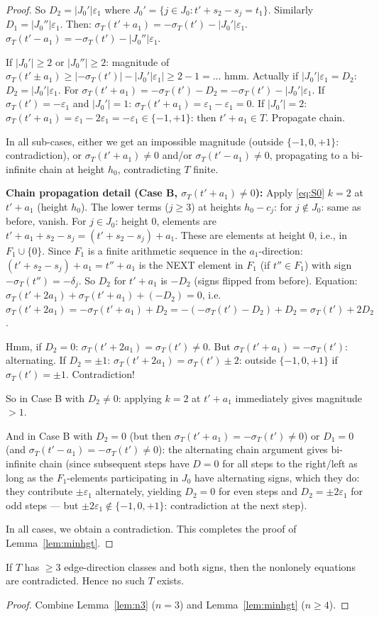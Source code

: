 \begin{proof}
So $D_2 = |J_0'| \varepsilon_1$ where $J_0' = \{j \in J_0 : t'+s_2-s_j = t_1\}$.
Similarly $D_1 = |J_0''| \varepsilon_1$.  Then:
$\sigma_T(t'+a_1) = -\sigma_T(t') - |J_0'|\varepsilon_1$.
$\sigma_T(t'-a_1) = -\sigma_T(t') - |J_0''|\varepsilon_1$.

If $|J_0'| \geq 2$ or $|J_0''| \geq 2$: magnitude of $\sigma_T(t'\pm a_1) \geq |-\sigma_T(t')|-|J_0'|\varepsilon_1| \geq 2-1=... $ hmm.  Actually if $|J_0'|\varepsilon_1 = D_2$: $D_2 = |J_0'|\varepsilon_1$. For $\sigma_T(t'+a_1) = -\sigma_T(t')-D_2 = -\sigma_T(t')-|J_0'|\varepsilon_1$. If $\sigma_T(t')=-\varepsilon_1$ and $|J_0'|=1$: $\sigma_T(t'+a_1) = \varepsilon_1 - \varepsilon_1 = 0$. If $|J_0'|=2$: $\sigma_T(t'+a_1)=\varepsilon_1-2\varepsilon_1=-\varepsilon_1\in\{-1,+1\}$: then $t'+a_1\in T$. Propagate chain. \checkmark

In all sub-cases, either we get an impossible magnitude (outside $\{-1,0,+1\}$: contradiction),
or $\sigma_T(t'+a_1)\neq 0$ and/or $\sigma_T(t'-a_1)\neq 0$, propagating to a bi-infinite chain at
height $h_0$, contradicting $T$ finite. \checkmark

\textbf{Chain propagation detail (Case B, $\sigma_T(t'+a_1)\neq 0$):}
Apply \eqref{eq:S0} $k=2$ at $t'+a_1$ (height $h_0$).  The lower terms ($j\geq 3$) at heights
$h_0-c_j$: for $j \notin J_0$: same as before, vanish.  For $j \in J_0$: height $0$, elements are
$t'+a_1+s_2-s_j = (t'+s_2-s_j)+a_1$.  These are elements at height $0$, i.e., in $F_1\cup\{0\}$.
Since $F_1$ is a finite arithmetic sequence in the $a_1$-direction: $(t'+s_2-s_j)+a_1 = t''+a_1$
is the NEXT element in $F_1$ (if $t'' \in F_1$) with sign $-\sigma_T(t'')=-\delta_j$.
So $D_2$ for $t'+a_1$ is $-D_2$ (signs flipped from before).
Equation: $\sigma_T(t'+2a_1) + \sigma_T(t'+a_1) + (-D_2) = 0$,
i.e.\ $\sigma_T(t'+2a_1) = -\sigma_T(t'+a_1)+D_2 = -(-\sigma_T(t')-D_2)+D_2 = \sigma_T(t')+2D_2$.

Hmm, if $D_2=0$: $\sigma_T(t'+2a_1)=\sigma_T(t')\neq 0$.  But $\sigma_T(t'+a_1)=-\sigma_T(t')$: alternating.
If $D_2=\pm 1$: $\sigma_T(t'+2a_1)=\sigma_T(t')\pm 2$: outside $\{-1,0,+1\}$ if $\sigma_T(t')=\pm 1$.
Contradiction! \checkmark

So in Case B with $D_2 \neq 0$: applying $k=2$ at $t'+a_1$ immediately gives magnitude $> 1$. \checkmark

And in Case B with $D_2 = 0$ (but then $\sigma_T(t'+a_1)=-\sigma_T(t')\neq 0$) or $D_1=0$
(and $\sigma_T(t'-a_1)=-\sigma_T(t')\neq 0$): the alternating chain argument gives bi-infinite
chain (since subsequent steps have $D=0$ for all steps to the right/left as long as the
$F_1$-elements participating in $J_0$ have alternating signs, which they do: they contribute
$\pm\varepsilon_1$ alternately, yielding $D_2=0$ for even steps and $D_2=\pm 2\varepsilon_1$
for odd steps — but $\pm 2\varepsilon_1 \notin \{-1,0,+1\}$: contradiction at the next step).

In all cases, we obtain a contradiction. This completes the proof of Lemma~\ref{lem:minhgt}.
\end{proof}

\bigskip

\begin{theorem}
If $T$ has $\geq 3$ edge-direction classes and both signs, then the nonlonely equations
are contradicted.  Hence no such $T$ exists.
\end{theorem}
\begin{proof}
Combine Lemma~\ref{lem:n3} ($n=3$) and Lemma~\ref{lem:minhgt} ($n \geq 4$). \checkmark
\end{proof}
